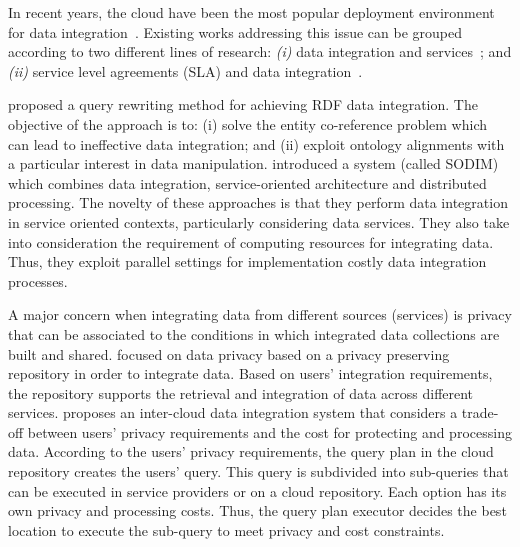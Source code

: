 In recent years, the cloud have been the most popular deployment environment for data integration~\cite{Carvalho2015}. Existing works addressing this issue can be grouped according to two different lines of research:
\textit{(i)} data integration and services~\cite{Correndo2010,ElSheikh2013,Tian2010,YauY08}; and
\textit{(ii)} service level agreements (SLA) and data integration~\cite{Bennani2014,Nie07}. 

\cite{Correndo2010} proposed a query rewriting method for achieving RDF data integration. %
The objective of the approach is to: (i) solve the entity co-reference problem which can lead to ineffective data integration; and (ii) exploit ontology alignments with a particular interest in data manipulation. 
\cite{ElSheikh2013} introduced a system (called SODIM) which combines data integration, service-oriented architecture and distributed processing. %
The novelty of these approaches is that they perform data integration in service oriented contexts, particularly considering data services. They also take into consideration the requirement of computing resources for integrating data. Thus, they exploit parallel settings for implementation costly data integration processes. 

A major concern when integrating data from different sources (services) is privacy that can be associated to the conditions in which integrated data collections are built and shared.
\cite{YauY08} focused on data privacy based on  a privacy preserving repository in order to integrate data. 
Based on users' integration requirements, the repository supports the retrieval and integration of
data across different services. 
\cite{Tian2010} proposes an inter-cloud data integration system that considers a trade-off between users' privacy requirements and the cost for protecting and processing data. According to the users' privacy requirements, the query plan in the cloud repository creates the users' query. This query is subdivided into sub-queries that can
be executed in service providers or on a cloud repository. Each option has its own  privacy and processing costs.
Thus, the query plan executor decides the best location to execute the sub-query to meet privacy and cost constraints.

